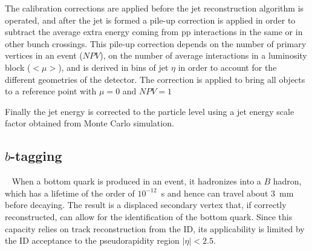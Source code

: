 The calibration corrections are applied 
before the jet reconstruction algorithm is operated, and after 
the jet is formed a pile-up correction
is applied in order to subtract the average
extra energy coming from pp interactions in
the same or in other bunch crossings.
This pile-up correction depends on the number of primary vertices in an event ($NPV$),
on the number of average interactions in 
a luminosity block ($<\mu>$), and is derived in bins of jet $\eta$ in order to
account for the different geometries of the detector. The
correction is applied to bring all objects to a 
reference point with $\mu=0$ and $NPV = 1$

Finally the jet energy is corrected to the particle
level using a jet energy scale factor obtained
from Monte Carlo simulation.











\myskip
\tocless\subsection{$b$-tagging}~\label{sec:btagging}
When a bottom quark is produced in an event, it hadronizes into a $B$ hadron, which has
a lifetime of the order of $10^{-12}$~s and hence can travel about 3~mm before decaying.
The result is a displaced secondary vertex that, if correctly reconstructed, can
allow for the identification of the bottom quark. 
Since this capacity relies on track reconstruction from the ID, its applicability
is limited by the ID acceptance to the pseudorapidity region $|\eta|<2.5$.

